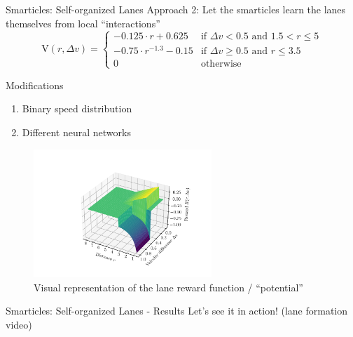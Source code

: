 \documentclass[10pt,xcolor=table, aspectratio=1610]{beamer}
\begin{document}
\begin{frame}{Smarticles: Self-organized Lanes}
  Approach 2: Let the smarticles learn the lanes themselves from local \enquote{interactions}\\
  \begin{equation*}
    \text{V}(r, \Delta v) = \begin{cases}
      -0.125 \cdot r + 0.625 & \text{if } \Delta v < 0.5 \text{ and } 1.5 < r \le 5 \\
      -0.75 \cdot r^{-1.3} - 0.15 & \text{if } \Delta v \ge 0.5 \text{ and } r \le 3.5 \\
      0 & \text{otherwise}
  \end{cases}
  \end{equation*}
  \begin{block}{Modifications}
    \begin{enumerate}
      \item Binary speed distribution
      \item Different neural networks
    \end{enumerate}
  \end{block}
\end{frame}

\begin{frame}
  \begin{figure}
    \includegraphics[width=0.6\textwidth]{../Thesis/img/results/lane_reward_func_3d_cropped.pdf}
    \caption*{\hspace{0.2\textwidth}Visual representation of the lane reward function / \enquote{potential}}
  \end{figure}
\end{frame}

\begin{frame}{Smarticles: Self-organized Lanes - Results}
  Let's see it in action! (lane formation video)
\end{frame}
\end{document}
